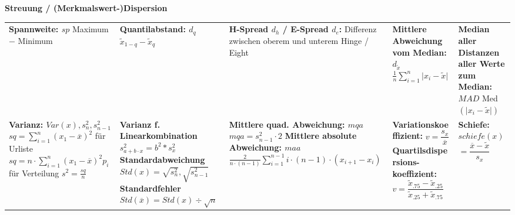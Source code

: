 \documentclass[fleqn, oneside, 10pt, titlepage]{article}
\begin{document}
\normalsize
\textbf{Streuung / (Merkmalswert-)Dispersion}\\
\scriptsize{
\begin{tabularx}{\textwidth}{p{13em}p{13em}p{13em}p{13em}p{10em}}
\textbf{Spannweite: $sp$}\newline
	Maximum $-$ Minimum\newline
 &
\textbf{Quantilabstand: $d_q$}\newline
	$ \tilde{x}_{1-q} - \tilde{x}_{q}$
 &
\textbf{H-Spread $d_h$ / E-Spread $d_e$:}\newline
	Differenz zwischen oberem und unterem Hinge / Eight	
	
 &
\textbf{Mittlere Abweichung vom Median: $d_{\tilde{x}}$}\newline
	$\frac{1}{n} \sum\limits^n_{i=1} \vert x_i - \tilde{x} \vert$ 
 
 &
\textbf{Median aller Distanzen aller Werte zum Median: $MAD$} \newline
Med$(\vert x_i - \tilde{x} \vert)$ 
\\
\textbf{Varianz: $Var(x), s^2_n, s^2_{n-1}$}\newline
$sq = \sum\limits_{i=1}^n (x_1 - \overline{x})^2 $ für Urliste \newline
$sq = n\cdot\sum\limits_{i=1}^n (x_1 - \overline{x})^2 p_i $ für Verteilung \vspace{0.3em}\newline
$s^2 = \frac{sq}{n}$
&
\textbf{Varianz f. Linearkombination}\newline
$s^2_{a+b\cdot x}= b^2*s^2_x$\vspace{0.5em}\newline
\textbf{Standardabweichung}\newline
$Std(x) = \sqrt{s^2_n}, \sqrt{s^2_{n-1}}$\vspace{0.5em}\newline
\textbf{Standardfehler}\newline
$Std(\overline{x}) = Std(x) \div \sqrt{n}$
&
\textbf{Mittlere quad. Abweichung: $mqa$}\newline
$mqa = s^2_{n-1} \cdot 2$\vspace{0.5em}\newline
\textbf{Mittlere absolute Abweichung: $maa$}\newline
$\frac{2}{n\cdot(n-1)}\sum\limits_{i=1}^{n-1} i\cdot (n-1) \cdot (x_{i+1} - x_i)$
&
\textbf{Variationskoeffizient:}\vspace{0.3em}\newline
$v = \dfrac{s_x}{\overline{x}}$\vspace{0.5em}\newline
\textbf{Quartilsdispersions-koeffizient:}\vspace{0.3em}\newline
$v = \dfrac{\tilde{x}_.75 - \tilde{x}_.25}{\tilde{x}_.25 + \tilde{x}_.75}$
&
\textbf{Schiefe:}\vspace{0.4em}\newline
$schiefe(x)$\vspace{0.4em}\newline$ = \dfrac{\overline{x} - \tilde{x}}{s_x}$

\end{tabularx} 
}
\end{document}
